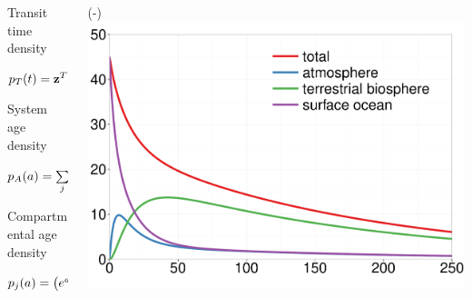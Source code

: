 
\begin{columns}
	\setlength{\lc}{0.5\textwidth}
	\begin{column}{\lc}
		Transit time density
		
		$p_T(t) = \mathbf{z}^T\,e^{t\,\mathbf{\mathrm{A}}}\,\mathbf{u}$
		
		System age density
		
		$p_A(a) =\sum\limits_j \left(e^{a\,\mathbf{\mathrm{A}}}\,\mathbf{u}\right)_j$

		Compartmental age density

                $p_{j}(a) = \left(e^{a\,\mathbf{\mathrm{A}}}\,\mathbf{u}\right)_j$
	\end{column}
	\begin{column}{\the\dimexpr (\textwidth-\lc) \relax }
		\includegraphics[width=0.9\lc]{images/content/ss.pdf}
	\end{column}
\end{columns}
